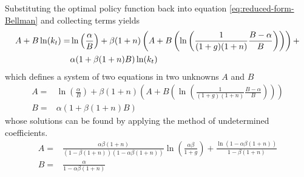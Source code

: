 \documentclass[11pt]{article}
\begin{document}
Substituting the optimal policy function back into equation
\ref{eq:reduced-form-Bellman} and collecting terms yields
\begin{align}
A + B\ln(k_t) %
=& \ln\left(\frac{\alpha}{B}\right) + \beta(1+n)\left(A +
B\left(\ln\left(\frac{1}{(1+g)(1+n)}\frac{B -
      \alpha}{B}\right)\right)\right) + \\ \notag 
&\alpha(1 + \beta(1+n)B)\ln(k_t) 
\end{align}
which defines a system of two equations in two unknowns $A$ and $B$
\begin{align}
A =& \ln\left(\frac{\alpha}{B}\right) + \beta(1+n)\left(A +
B\left(\ln\left(\frac{1}{(1+g)(1+n)}\frac{B -
      \alpha}{B}\right)\right)\right) \\  
B =& \alpha(1 + \beta(1+n)B)
\end{align}
whose solutions can be found by applying the method of undetermined
coefficients.
\begin{align}
A=& \frac{\alpha\beta(1+n)}{(1-\beta(1+n))(1-\alpha\beta(1+n))}
\ln\left(\frac{\alpha\beta}{1+g}\right)  
+ \frac{\ln(1-\alpha\beta(1+n))}{1 - \beta(1+n)} \\
B =& \frac{\alpha}{1 - \alpha\beta(1+n)}
\end{align}
\end{document}
